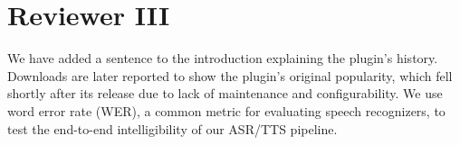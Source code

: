 \documentclass[journal,12pt,onecolumn,draftclsnofoot,]{IEEEtran}
\begin{document}
%
%
%
%
%
%
%


\section{Reviewer III}

%
%
%

We have added a sentence to the introduction explaining the plugin's history. Downloads are later reported to show the plugin's original popularity, which fell shortly after its release due to lack of maintenance and configurability. We use word error rate (WER), a common metric for evaluating speech recognizers, to test the end-to-end intelligibility of our ASR/TTS pipeline.
\end{document}
